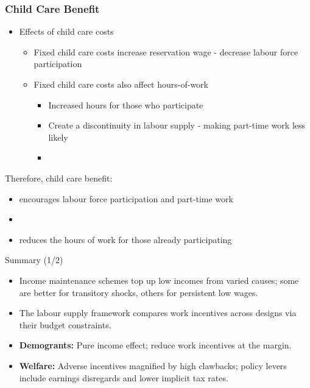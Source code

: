 \documentclass[aspectratio=169]{beamer}
\begin{document}
 
 
  \begin{frame} \frametitle{Child Care Benefit}
\label{Child Care Benefit}

\begin{itemize}[<+->]


\item Effects of child care costs

\begin{itemize}[<+->]
\item Fixed child care costs increase reservation wage - decrease labour force participation

\item Fixed child care costs also affect hours-of-work
\begin{itemize}
\item Increased hours for those who participate
\item Create a discontinuity in labour supply -  making part-time work less likely
\item[]
\end{itemize}
\end{itemize}
\end{itemize}

Therefore,  child care benefit:
\begin{itemize}
\item encourages labour force participation and part-time work
\item[]
\item reduces the hours of work for those already participating
 \end{itemize}
 \end{frame}


\begin{frame}{Summary (1/2)}
\transfade
\begin{itemize}[<+->]
  \item Income maintenance schemes top up low incomes from varied causes; some are better for transitory shocks, others for persistent low wages.
  \item The labour supply framework compares work incentives across designs via their budget constraints.
  \item \textbf{Demogrants:} Pure income effect; reduce work incentives at the margin.
  \item \textbf{Welfare:} Adverse incentives magnified by high clawbacks; policy levers include earnings disregards and lower implicit tax rates.
\end{itemize}
\end{frame}
\end{document}
